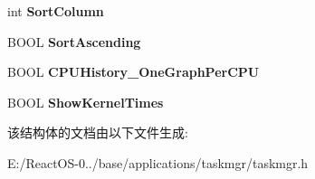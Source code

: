 \begin{DoxyCompactItemize}
\mbox{\label{struct_t_a_s_k_m_a_n_a_g_e_r___s_e_t_t_i_n_g_s_ae3b1f42923c3735cf910f57c9ee4ca31}} 
int {\bfseries Sort\+Column}
\item 
\mbox{\label{struct_t_a_s_k_m_a_n_a_g_e_r___s_e_t_t_i_n_g_s_a038a8f4ff4d4313ffc0a4b88a211ba68}} 
B\+O\+OL {\bfseries Sort\+Ascending}
\item 
\mbox{\label{struct_t_a_s_k_m_a_n_a_g_e_r___s_e_t_t_i_n_g_s_ac3aa29f9627483dd6aecc1d7dfebd496}} 
B\+O\+OL {\bfseries C\+P\+U\+History\+\_\+\+One\+Graph\+Per\+C\+PU}
\item 
\mbox{\label{struct_t_a_s_k_m_a_n_a_g_e_r___s_e_t_t_i_n_g_s_aba612fd7e59cec380c617efb7d59736f}} 
B\+O\+OL {\bfseries Show\+Kernel\+Times}
\end{DoxyCompactItemize}


该结构体的文档由以下文件生成\+:\begin{DoxyCompactItemize}
\item 
E\+:/\+React\+O\+S-\/0../base/applications/taskmgr/taskmgr.\+h\end{DoxyCompactItemize}
